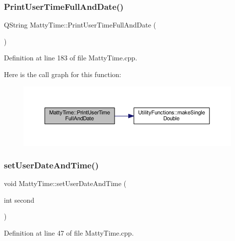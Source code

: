 \subsubsection{\texorpdfstring{Print\+User\+Time\+Full\+And\+Date()}{PrintUserTimeFullAndDate()}}
{\footnotesize\ttfamily Q\+String Matty\+Time\+::\+Print\+User\+Time\+Full\+And\+Date (\begin{DoxyParamCaption}{ }\end{DoxyParamCaption})}



Definition at line 183 of file Matty\+Time.\+cpp.

Here is the call graph for this function\+:
\nopagebreak
\begin{figure}[H]
\begin{center}
\leavevmode
\includegraphics[width=350pt]{classMattyTime_a6bcaa1f4975d99ab2f9025076de5ef99_cgraph}
\end{center}
\end{figure}
\hypertarget{classMattyTime_a858357a5febc483c27f9bbf96b83b175}{}\label{classMattyTime_a858357a5febc483c27f9bbf96b83b175} 
\subsubsection{\texorpdfstring{set\+User\+Date\+And\+Time()}{setUserDateAndTime()}\hspace{0.1cm}{\footnotesize\ttfamily [1/5]}}
{\footnotesize\ttfamily void Matty\+Time\+::set\+User\+Date\+And\+Time (\begin{DoxyParamCaption}\item[{int}]{second }\end{DoxyParamCaption})}



Definition at line 47 of file Matty\+Time.\+cpp.

\hypertarget{classMattyTime_a60828ca950added6776f53ca3ea047fc}{}\label{classMattyTime_a60828ca950added6776f53ca3ea047fc} 
